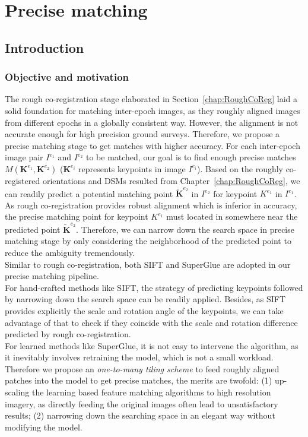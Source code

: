 
\chapter{Precise matching}
\label{chap:Precisematching}
\minitoc

\section{Introduction}
\subsection{Objective and motivation}
The rough co-registration stage elaborated in Section~\ref{chap:RoughCoReg} laid a solid foundation for matching inter-epoch images, as they roughly aligned images from different epochs in a globally consistent way. However, the alignment is not accurate enough for high precision ground surveys. Therefore, we propose a precise matching stage to get matches with higher accuracy. 
For each inter-epoch image pair $I^{e_1}$ and $I^{e_2}$ to be matched, our goal is to find enough precise matches $M({\mathbf{K}^{e_1},\mathbf{K}^{e_2}})$ ($\mathbf{K}^{e_i}$ represents keypoints in image $I^{e_i}$). 
Based on the roughly co-registered orientations and \ac{DSM}s resulted from Chapter~\ref{chap:RoughCoReg}, 
we can readily predict a potential matching point $\widetilde{\mathbf{K}}^{e_2}$ in $I^{e_2}$ for keypoint ${K}^{e_1}$ in $I^{e_1}$. As rough co-registration provides robust alignment which is inferior in accuracy, the precise matching point for keypoint ${K}^{e_1}$ must located in somewhere near the predicted point $\widetilde{\mathbf{K}}^{e_2}$. Therefore, we can narrow down the search space in precise matching stage by only considering the neighborhood of the predicted point to reduce the ambiguity tremendously.\\
Similar to rough co-registration, both SIFT and SuperGlue are adopted in our precise matching pipeline.\\
For hand-crafted methods like SIFT, the strategy of predicting keypoints followed by narrowing down the search space can be readily applied. Besides, as SIFT provides explicitly the scale and rotation angle of the keypoints, we can take advantage of that to check if they coincide with the scale and rotation difference predicted by rough co-registration.\\
For learned methods like SuperGlue, it is not easy to intervene the algorithm, as it inevitably involves retraining the model, which is not a small workload. Therefore we propose an \textit{one-to-many tiling scheme} to feed roughly aligned patches into the model to get precise matches, the merits are twofold: (1) up-scaling the learning based feature matching algorithms to high resolution imagery, as directly feeding the original images often lead to unsatisfactory results; (2) narrowing down the searching space in an elegant way without modifying the model.
